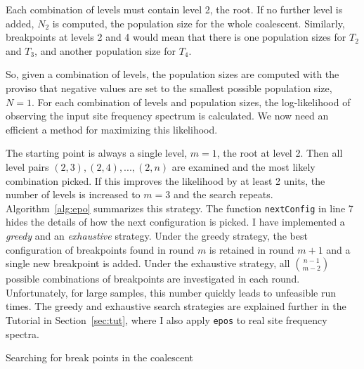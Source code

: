 \documentclass[a4paper, english]{article}
\newcommand{\ty}{\texttt}
\begin{document}
Each combination of levels must contain level 2, the root. If no
further level is added, $N_2$ is computed, the population size for the
whole coalescent. Similarly, breakpoints at levels 2 and 4 would mean
that there is one population sizes for $T_2$ and $T_3$, and another
population size for $T_4$.

So, given a combination of levels, the population sizes are computed
with the proviso that negative values are set to the smallest possible
population size, $N=1$. For each combination of levels and population
sizes, the log-likelihood of observing the input site frequency
spectrum is calculated. We now need an efficient a method
for maximizing this likelihood.

The starting point is always a single level, $m=1$, the root at level
2. Then all level pairs $(2,3), (2,4),...,(2,n)$ are examined and the
most likely combination picked. If this improves the likelihood by at
least 2 units, the number of levels is increased to $m=3$ and the
search repeats. Algorithm~\ref{alg:epo} summarizes this strategy. The
function \ty{nextConfig} in line 7 hides the details of how the next
configuration is picked. I have implemented a \emph{greedy} and
an \emph{exhaustive} strategy. Under the greedy strategy, the best
configuration of breakpoints found in round $m$ is retained in round
$m+1$ and a single new breakpoint is added. Under the exhaustive
strategy, all ${n-1\choose m-2}$ possible combinations of breakpoints
are investigated in each round. Unfortunately, for large samples, this
number quickly leads to unfeasible run times. The greedy and
exhaustive search strategies are explained further in the Tutorial in
Section~\ref{sec:tut}, where I also apply \ty{epos} to real site
frequency spectra.

\begin{algorithm}
  \caption{Searching for break points in the coalescent}\label{alg:epo}
  
\end{algorithm}
\end{document}
